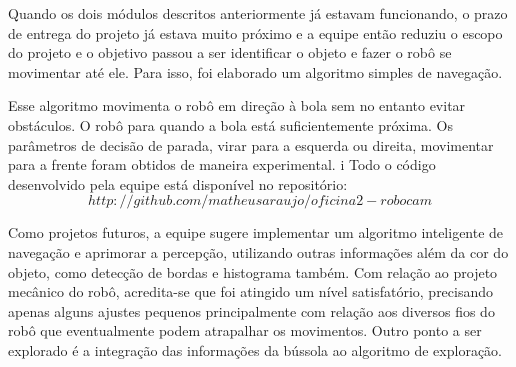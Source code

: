 Quando os dois módulos descritos anteriormente já estavam funcionando, o prazo de entrega do projeto já estava muito próximo e a equipe então reduziu o escopo do projeto e o objetivo passou a ser identificar o objeto e fazer o robô se movimentar até ele. Para isso, foi elaborado um algoritmo simples de navegação. 

Esse algoritmo movimenta o robô em direção à bola sem no entanto evitar obstáculos. O robô para quando a bola está suficientemente próxima. Os parâmetros de decisão de parada, virar para a esquerda ou direita, movimentar para a frente foram obtidos de maneira experimental. 
i
Todo o código desenvolvido pela equipe está disponível no repositório: $$ http://github.com/matheusaraujo/oficina2-robocam $$

Como projetos futuros, a equipe sugere implementar um algoritmo inteligente de navegação e aprimorar a percepção, utilizando outras informações além da cor do objeto, como detecção de bordas e histograma também. Com relação ao projeto mecânico do robô, acredita-se que foi atingido um nível satisfatório, precisando apenas alguns ajustes pequenos principalmente com relação aos diversos fios do robô que eventualmente podem atrapalhar os movimentos. Outro ponto a ser explorado é a integração das informações da bússola ao algoritmo de exploração.
